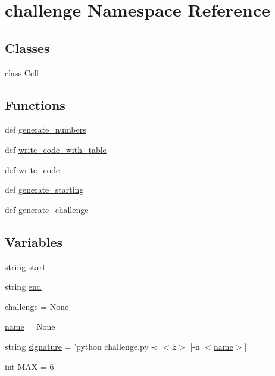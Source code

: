 \hypertarget{namespacechallenge}{\section{challenge Namespace Reference}
\label{namespacechallenge}
}
\subsection*{Classes}
\begin{DoxyCompactItemize}
\item 
class \hyperlink{classchallenge_1_1Cell}{Cell}
\end{DoxyCompactItemize}
\subsection*{Functions}
\begin{DoxyCompactItemize}
\item 
def \hyperlink{namespacechallenge_a3ea14140e24cfecfb81a4b018500c227}{generate\+\_\+numbers}
\item 
def \hyperlink{namespacechallenge_ab2d2b10f497543efd9ae0bd87007f9d9}{write\+\_\+code\+\_\+with\+\_\+table}
\item 
def \hyperlink{namespacechallenge_a1853eb3e006f638f42c1bd795a548fd2}{write\+\_\+code}
\item 
def \hyperlink{namespacechallenge_aef8c14de24d998c7715e953ebc0d922b}{generate\+\_\+starting}
\item 
def \hyperlink{namespacechallenge_a5aa2a94b7fc63849d6f948c586897fb4}{generate\+\_\+challenge}
\end{DoxyCompactItemize}
\subsection*{Variables}
\begin{DoxyCompactItemize}
\item 
string \hyperlink{namespacechallenge_a33c04a2446b66a565b08a110267a4c1e}{start}
\item 
string \hyperlink{namespacechallenge_afb0fb528223ea61f11c1b58c6347615b}{end}
\item 
\hyperlink{namespacechallenge_acbb95559d4ccdc708dbe25b0e3f4fdc1}{challenge} = None
\item 
\hyperlink{namespacechallenge_a87918958a52107704ecf6f8bbfda0bc0}{name} = None
\item 
string \hyperlink{namespacechallenge_a106c0b09acb89c2a5708100c0413cf3f}{signature} = 'python challenge.\+py -\/c $<$k$>$ \mbox{[}-\/n $<$\hyperlink{namespacechallenge_a87918958a52107704ecf6f8bbfda0bc0}{name}$>$\mbox{]}'
\item 
int \hyperlink{namespacechallenge_ad8c86193dd63741365d24f15c86016cd}{M\+A\+X} = 6
\end{DoxyCompactItemize}



